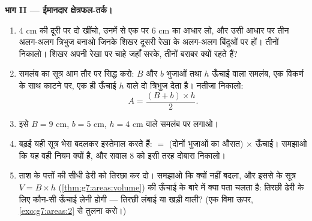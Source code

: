 \begin{problem}[{सप्ताहांत समस्या --- वह मशहूर ``प्रमाण'' कि
$64 = 65$, जिसका भेद क्षेत्रफल और ढलान खोल देते हैं, और मिठाई में
पिज़्ज़े तथा छल्ले}]
\medskip
\noindent\textbf{भाग II --- ईमानदार क्षेत्रफल-तर्क।}
\begin{enumerate}[resume]
  \item $4$ cm की दूरी पर दो  खींचो, उनमें से एक पर
        $6$ cm का आधार लो, और उसी आधार पर तीन अलग-अलग त्रिभुज
        बनाओ जिनके शिखर दूसरी रेखा के अलग-अलग बिंदुओं पर हों।
        तीनों  निकालो। शिखर अपनी रेखा पर चाहे जहाँ सरके,
        तीनों बराबर क्यों रहते हैं?
  \item समलंब का सूत्र आम तौर पर सिद्ध करो: $B$ और $b$ 
        भुजाओं तथा $h$ ऊँचाई वाला समलंब, एक विकर्ण के साथ काटने
        पर, एक ही ऊँचाई $h$ वाले दो त्रिभुज देता है। नतीजा
        निकालो:
        \[
        A = \frac{(B + b) \times h}{2} .
        \]
  \item इसे $B = 9$ cm, $b = 5$ cm, $h = 4$ cm वाले समलंब पर
        लगाओ।
  \item बढ़ई यही सूत्र भेस बदलकर इस्तेमाल करते हैं:  $=$
        (दोनों  भुजाओं का औसत) $\times$ ऊँचाई। समझाओ कि यह
        वही नियम क्यों है, और सवाल 8 को इसी तरह दोबारा निकालो।
  \item ताश के पत्तों की सीधी ढेरी को तिरछा कर दो। समझाओ कि 
        क्यों नहीं बदला, और इससे  के सूत्र
        $V = B \times h$ (\cref{thm:g7:areas:volume}) की ऊँचाई
        के बारे में क्या पता चलता है: तिरछी ढेरी के लिए कौन-सी
        ऊँचाई लेनी होगी --- तिरछी लंबाई या खड़ी वाली? (एक विमा
        ऊपर, \cref{exo:g7:areas:2} से तुलना करो।)
\end{enumerate}


\end{problem}
